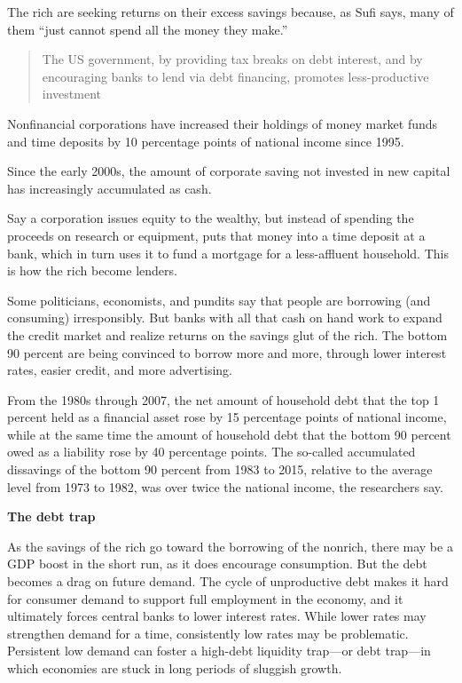 \documentclass[
]{book}
\begin{document}
The rich are seeking returns on their excess savings because, as Sufi says, many of them ``just cannot spend all the money they make.''

\begin{quote}
The US government, by providing tax breaks on debt interest, and by encouraging banks to lend via debt financing, promotes less-productive investment
\end{quote}

Nonfinancial corporations have increased their holdings of money market funds and time deposits by 10 percentage points of national income since 1995.

Since the early 2000s, the amount of corporate saving not invested in new capital has increasingly accumulated as cash.

Say a corporation issues equity to the wealthy, but instead of spending the proceeds on research or equipment, puts that money into a time deposit at a bank, which in turn uses it to fund a mortgage for a less-affluent household. This is how the rich become lenders.

Some politicians, economists, and pundits say that people are borrowing (and consuming) irresponsibly. But banks with all that cash on hand work to expand the credit market and realize returns on the savings glut of the rich. The bottom 90 percent are being convinced to borrow more and more, through lower interest rates, easier credit, and more advertising.

From the 1980s through 2007, the net amount of household debt that the top 1 percent held as a financial asset rose by 15 percentage points of national income, while at the same time the amount of household debt that the bottom 90 percent owed as a liability rose by 40 percentage points. The so-called accumulated dissavings of the bottom 90 percent from 1983 to 2015, relative to the average level from 1973 to 1982, was over twice the national income, the researchers say.

\textbf{The debt trap}

As the savings of the rich go toward the borrowing of the nonrich, there may be a GDP boost in the short run, as it does encourage consumption. But the debt becomes a drag on future demand.
The cycle of unproductive debt makes it hard for consumer demand to support full employment in the economy, and it ultimately forces central banks to lower interest rates.
While lower rates may strengthen demand for a time, consistently low rates may be problematic.
Persistent low demand can foster a high-debt liquidity trap---or debt trap---in which economies are stuck in long periods of sluggish growth.
\end{document}
